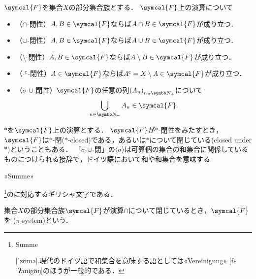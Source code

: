 \documentclass[main.tex]{subfiles}
\begin{document}
\(\symcal{F}\)を集合\(X\)の部分集合族とする．
\(\symcal{F}\)上の演算について
\begin{itemize}
    \item （\(\mathord{\cap}\)-閉性）\(A, B \in \symcal{F}\)ならば\(A \cap B \in \symcal{F}\)が成り立つ．
    \item （\(\mathord{\cup}\)-閉性）\(A, B \in \symcal{F}\)ならば\(A \cup B \in \symcal{F}\)が成り立つ．
    \item （\(\mathord{\setminus}\)-閉性）\(A, B \in \symcal{F}\)ならば\(A \setminus B \in \symcal{F}\)が成り立つ．
    \item （\({\mathord{\cdot}}^{\mathsf{c}}\)-閉性）\(A \in \symcal{F}\)ならば\(\setcomp{A} = X \setminus A \in \symcal{F}\)が成り立つ．
    \item （\(\sigma\)-\(\mathord{\cup}\)-閉性）\(\symcal{F}\)の任意の列\(\Sequence{A}\)について
        \begin{align*}
            \bigcup_{n \in \PositiveInteger} A_n \in \symcal{F}.
        \end{align*}
\end{itemize}
\(\mathord{*}\)を\(\symcal{F}\)上の演算とする．
\(\symcal{F}\)が\(\mathord{*}\)-閉性をみたすとき，\(\symcal{F}\)は\(\mathord{*}\)-閉(\(\mathord{*}\)-closed)である，あるいは\(\mathord{*}\)について閉じている(closed under \(\mathord{*}\))ということもある．
「\(\sigma\)-\(\mathord{\cup}\)-閉」の〈\(\sigma\)〉は可算個の集合の和集合に関係しているものにつけられる接辞で，ドイツ語において和や和集合を意味する\begin{german}«Summe»\end{german}\footnote{\begin{german}Summe\end{german} [ˈzʊmə].現代のドイツ語で和集合を意味する語としては\textgerman{«Vereinigung»} [fɛˈʔanɪgʊŋ]のほうが一般的である．
}のに対応するギリシャ文字である．

\begin{thmbox}
\begin{definition}
集合\(X\)の部分集合族\(\symcal{F}\)が演算\(\mathord{\cap}\)について閉じているとき，\(\symcal{F}\)を
(\(\pi\)-system)という．
\end{definition}
\end{thmbox}
\end{document}
